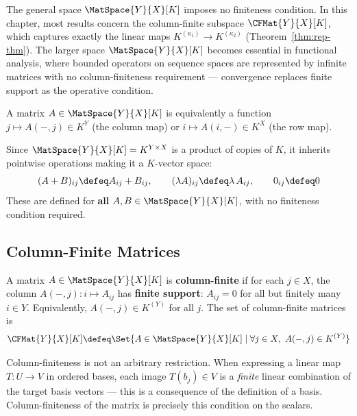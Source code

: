 \begin{remark}[Scope]
    The general space $\MatSpace{Y}{X}[K]$ imposes no finiteness condition. In this chapter,
    most results concern the column-finite subspace $\CFMat{Y}{X}[K]$, which captures exactly
    the linear maps $K^{(\kappa_1)} \to K^{(\kappa_2)}$
    (Theorem~\ref{thm:rep-thm}). The larger space $\MatSpace{Y}{X}[K]$ becomes essential in
    functional analysis, where bounded operators on sequence spaces are represented by infinite
    matrices with no column-finiteness requirement --- convergence replaces finite support as
    the operative condition.
\end{remark}

\begin{remark}[Currying]
    A matrix $A \in \MatSpace{Y}{X}[K]$ is equivalently a function
    $j \mapsto A(-,j) \in K^Y$ (the column map) or $i \mapsto A(i,-) \in K^X$ (the row map).
\end{remark}

\begin{definition}
\label{def:mat-add-scalar}
    Since $\MatSpace{Y}{X}[K] = K^{Y \times X}$ is a product of copies of $K$, it inherits
    pointwise operations making it a $K$-vector space:
    \[
        (A + B)_{ij} \defeq A_{ij} + B_{ij}, \qquad
        (\lambda A)_{ij} \defeq \lambda\, A_{ij}, \qquad
        0_{ij} \defeq 0
    \]
    These are defined for \textbf{all} $A, B \in \MatSpace{Y}{X}[K]$, with no finiteness
    condition required.
\end{definition}

\subsection{Column-Finite Matrices}

\begin{definition}
\label{def:cfmat-space}
    A matrix $A \in \MatSpace{Y}{X}[K]$ is \textbf{column-finite} if for each $j \in X$,
    the column $A(-,j): i \mapsto A_{ij}$ has \textbf{finite support}:
    $A_{ij} = 0$ for all but finitely many $i \in Y$. Equivalently, $A(-,j) \in K^{(Y)}$
    for all $j$. The set of column-finite matrices is
    \[
        \CFMat{Y}{X}[K] \defeq \Set{A \in \MatSpace{Y}{X}[K] \mid
            \forall j \in X,\ A(-,j) \in K^{(Y)}}
    \]
\end{definition}

\begin{remark}
    Column-finiteness is not an arbitrary restriction. When expressing a linear map $T: U \to V$
    in ordered bases, each image $T(b_j) \in V$ is a \emph{finite} linear combination of the
    target basis vectors --- this is a consequence of the definition of a basis. Column-finiteness
    of the matrix is precisely this condition on the scalars.
\end{remark}

